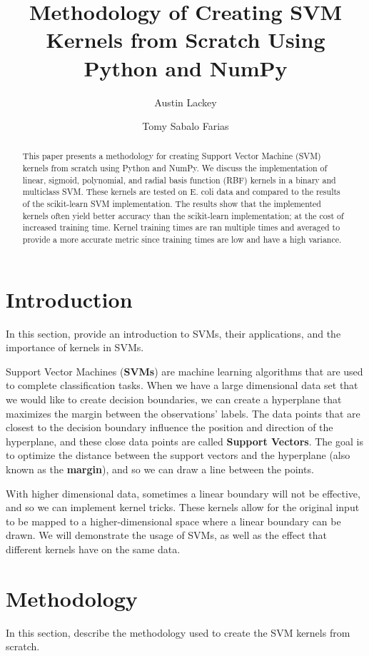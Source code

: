 \documentclass[12pt]{article}
\title{Methodology of Creating SVM Kernels from Scratch Using Python and NumPy}
\author{Austin Lackey}
\author{Tomy Sabalo Farias}
\affil{DSCI 320, Colorado State University}
\begin{document}
\maketitle

\begin{abstract}
This paper presents a methodology for creating Support Vector Machine (SVM) kernels from scratch using Python and NumPy. 
We discuss the implementation of linear, sigmoid, polynomial, and radial basis function (RBF) kernels in a binary and multiclass SVM.
These kernels are tested on E. coli data and compared to the results of the scikit-learn SVM implementation.
The results show that the implemented kernels often yield better accuracy than the scikit-learn implementation; at the
cost of increased training time. Kernel training times are ran multiple times and averaged to provide a more accurate
metric since training times are low and have a high variance.
\end{abstract}

\section{Introduction}
In this section, provide an introduction to SVMs, their applications, and the importance of
kernels in SVMs.

Support Vector Machines (\textbf{SVMs}) are machine learning algorithms that are used to complete classification tasks. When we have a large dimensional data set that we would like to create decision boundaries, we can create a hyperplane that maximizes the margin between the observations' labels. The data points that are closest to the decision boundary influence the position and direction of the hyperplane, and these close data points are called \textbf{Support Vectors}. The goal is to optimize the distance between the support vectors and the hyperplane (also known as the \textbf{margin}), and so we can draw a line between the points.

With higher dimensional data, sometimes a linear boundary will not be effective, and so we can implement kernel tricks. These kernels allow for the original input to be mapped to a higher-dimensional space where a linear boundary can be drawn. We will demonstrate the usage of SVMs, as well as the effect that different kernels have on the same data. 

\section{Methodology}
In this section, describe the methodology used to create the SVM kernels from scratch.
\end{document}
